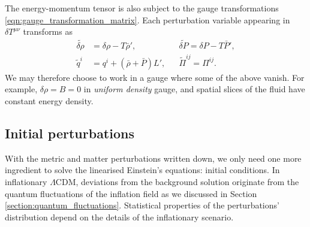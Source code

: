The energy-momentum tensor is also subject to the gauge transformations \eqref{eqn:gauge_transformation_matrix}. Each perturbation variable appearing in $\delta T^{\mu\nu}$ transforms as
\begin{align}
	\tilde{\delta\rho} &= \delta\rho - T\bar{\rho}',  &&\tilde{\delta P} = \delta P -T\bar{P}', \label{eqn:gauge_transform_perturbations_3}\\
	\tilde{q}^i &= q^i + (\bar{\rho} + \bar{P})L',  &&\tilde{\Pi}^{ij} = \Pi^{ij}. \label{eqn:gauge_transform_perturbations_4}
\end{align}
We may therefore choose to work in a gauge where some of the above vanish. For example, $\delta \rho = B = 0$ in \textit{uniform density} gauge, and spatial slices of the fluid have constant energy density.


\subsection{Initial perturbations}

With the metric and matter perturbations written down, we only need one more ingredient to solve the linearised Einstein's equations: initial conditions. In inflationary $\Lambda$CDM, deviations from the background solution originate from the quantum fluctuations of the inflation field as we discussed in Section \ref{section:quantum_fluctuations}. Statistical properties of the perturbations' distribution depend on the details of the inflationary scenario.

